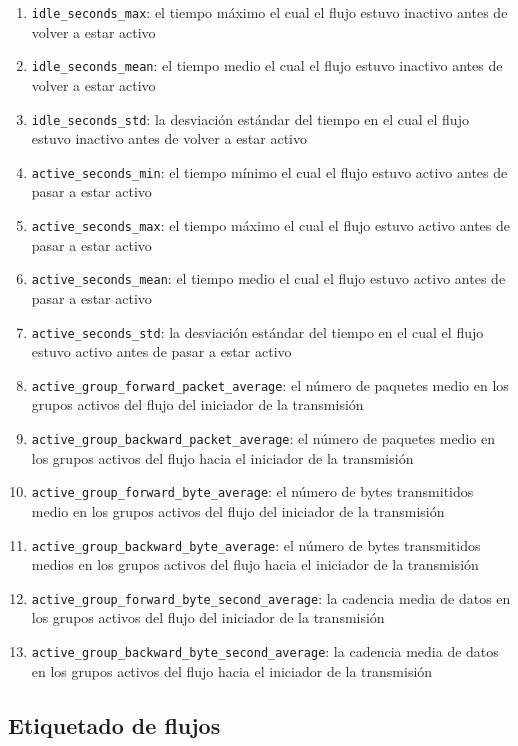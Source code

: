 \begin{enumerate}
  \item \texttt{idle\_seconds\_max}: el tiempo máximo el cual el flujo estuvo inactivo antes de volver a estar activo
  \item \texttt{idle\_seconds\_mean}: el tiempo medio el cual el flujo estuvo inactivo antes de volver a estar activo
  \item \texttt{idle\_seconds\_std}: la desviación estándar del tiempo en el cual el flujo estuvo inactivo antes de volver a estar activo
  \item \texttt{active\_seconds\_min}: el tiempo mínimo el cual el flujo estuvo activo antes de pasar a estar activo
  \item \texttt{active\_seconds\_max}: el tiempo máximo el cual el flujo estuvo activo antes de pasar a estar activo
  \item \texttt{active\_seconds\_mean}: el tiempo medio el cual el flujo estuvo activo antes de pasar a estar activo 
  \item \texttt{active\_seconds\_std}: la desviación estándar del tiempo en el cual el flujo estuvo activo antes de pasar a estar activo
  \item \texttt{active\_group\_forward\_packet\_average}: el número de paquetes medio en los grupos activos del flujo del iniciador de la transmisión
  \item \texttt{active\_group\_backward\_packet\_average}: el número de paquetes medio en los grupos activos del flujo hacia el iniciador de la transmisión
  \item \texttt{active\_group\_forward\_byte\_average}: el número de bytes transmitidos medio en los grupos activos del flujo del iniciador de la transmisión
  \item \texttt{active\_group\_backward\_byte\_average}: el número de bytes transmitidos medios en los grupos activos del flujo hacia el iniciador de la transmisión
  \item \texttt{active\_group\_forward\_byte\_second\_average}: la cadencia media de datos en los grupos activos del flujo del iniciador de la transmisión
  \item \texttt{active\_group\_backward\_byte\_second\_average}: la cadencia media de datos en los grupos activos del flujo hacia el iniciador de la transmisión
\end{enumerate}

\subsection{Etiquetado de flujos} \label{flowtag}

